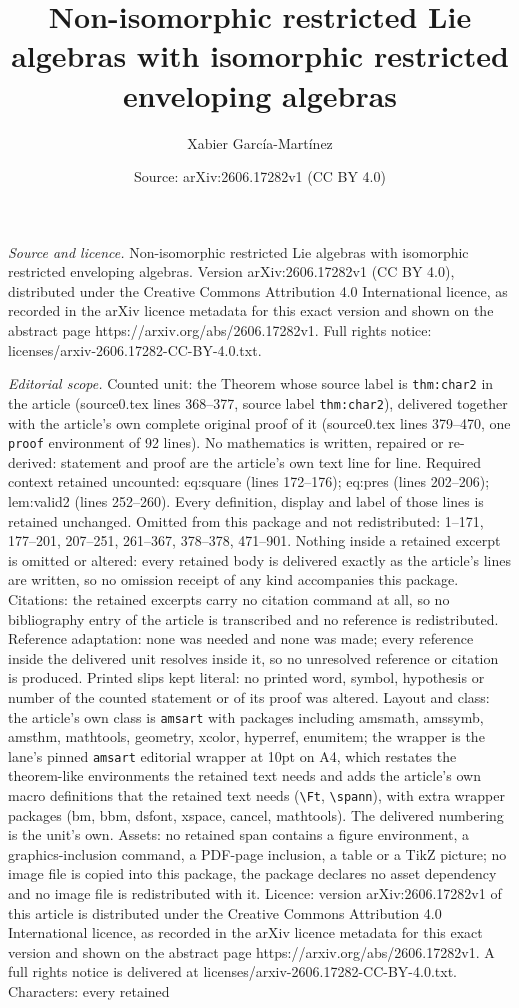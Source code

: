 \documentclass[10pt,a4paper]{amsart}
\title[Non-isomorphic restricted Lie algebras with isomorphic restr]{Non-isomorphic restricted Lie algebras with isomorphic restricted enveloping algebras}
\author{Xabier Garc\'ia-Mart\'inez}
\date{Source: arXiv:2606.17282v1 (CC BY 4.0)}
\begin{document}
\maketitle

\noindent\emph{Source and licence.} Non-isomorphic restricted Lie algebras with isomorphic restricted enveloping algebras. Version arXiv:2606.17282v1 (CC BY 4.0), distributed under the Creative Commons Attribution 4.0 International licence, as recorded in the arXiv licence metadata for this exact version and shown on the abstract page https://arxiv.org/abs/2606.17282v1. Full rights notice: licenses/arxiv-2606.17282-CC-BY-4.0.txt.\par\smallskip

\noindent\textit{Editorial scope.} Counted unit: the Theorem whose source label is \texttt{thm:char2} in the article (source0.tex lines 368--377, source label \texttt{thm:char2}), delivered together with the article's own complete original proof of it (source0.tex lines 379--470, one \texttt{proof} environment of 92 lines). No mathematics is written, repaired or re-derived: statement and proof are the article's own text line for line. Required context retained uncounted: eq:square (lines 172--176); eq:pres (lines 202--206); lem:valid2 (lines 252--260). Every definition, display and label of those lines is retained unchanged. Omitted from this package and not redistributed: 1--171, 177--201, 207--251, 261--367, 378--378, 471--901. Nothing inside a retained excerpt is omitted or altered: every retained body is delivered exactly as the article's lines are written, so no omission receipt of any kind accompanies this package. Citations: the retained excerpts carry no citation command at all, so no bibliography entry of the article is transcribed and no reference is redistributed. Reference adaptation: none was needed and none was made; every reference inside the delivered unit resolves inside it, so no unresolved reference or citation is produced. Printed slips kept literal: no printed word, symbol, hypothesis or number of the counted statement or of its proof was altered. Layout and class: the article's own class is \texttt{amsart} with packages including amsmath, amssymb, amsthm, mathtools, geometry, xcolor, hyperref, enumitem; the wrapper is the lane's pinned \texttt{amsart} editorial wrapper at 10pt on A4, which restates the theorem-like environments the retained text needs and adds the article's own macro definitions that the retained text needs (\texttt{\textbackslash Ft}, \texttt{\textbackslash spann}), with extra wrapper packages (bm, bbm, dsfont, xspace, cancel, mathtools). The delivered numbering is the unit's own. Assets: no retained span contains a figure environment, a graphics-inclusion command, a PDF-page inclusion, a table or a TikZ picture; no image file is copied into this package, the package declares no asset dependency and no image file is redistributed with it. Licence: version arXiv:2606.17282v1 of this article is distributed under the Creative Commons Attribution 4.0 International licence, as recorded in the arXiv licence metadata for this exact version and shown on the abstract page https://arxiv.org/abs/2606.17282v1. A full rights notice is delivered at licenses/arxiv-2606.17282-CC-BY-4.0.txt. Characters: every retained 
\end{document}
